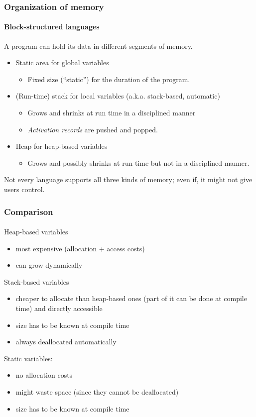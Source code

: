 \documentclass{beamer}
\begin{document}
\begin{frame}[fragile]
\frametitle{Organization of memory}
\framesubtitle{Block-structured languages}
A program can hold its data in different segments of memory.
\begin{itemize}
\item Static area for global variables
\begin{itemize}
\item Fixed size (``static'') for the duration of 
the program.
\end{itemize} 
\item (Run-time) stack for local variables (a.k.a. stack-based, automatic)
\begin{itemize}
\item  Grows and shrinks at run time in a disciplined
manner
\item  \emph{Activation records} are pushed and popped. 
\end{itemize}

\item Heap for heap-based variables
\begin{itemize}
\item Grows and possibly shrinks at run time but not
in a disciplined manner. 
\end{itemize}
\end{itemize}
Not every language supports all three kinds of memory; even if,
it might not give users control. 
\end{frame}


\begin{frame}[fragile]
\frametitle{Comparison}
\framesubtitle{}
Heap-based variables 
\begin{itemize}
\item most expensive (allocation + access costs)
\item can grow dynamically 
\end{itemize}

Stack-based variables
\begin{itemize}
\item cheaper to allocate than heap-based
ones (part of it can be done at compile time) and directly accessible 
\item size has to be known at compile time
\item always deallocated automatically
\end{itemize}
Static variables:
\begin{itemize}
\item no allocation costs
\item  might waste space
(since they cannot be deallocated) 
\item size has to be known at compile time
\end{itemize}
\end{frame}
\end{document}
